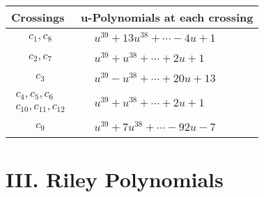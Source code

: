 \documentclass[1p]{elsarticle_modified}
\theoremstyle{definition}
\begin{document}
\begin{tabular}{m{50pt}|m{274pt}}
Crossings & \hspace{64pt}u-Polynomials at each crossing \\
\hline $$\begin{aligned}c_{1},c_{8}\end{aligned}$$&$\begin{aligned}
&u^{39}+13 u^{38}+\cdots-4 u+1
\end{aligned}$\\
\hline $$\begin{aligned}c_{2},c_{7}\end{aligned}$$&$\begin{aligned}
&u^{39}+u^{38}+\cdots+2 u+1
\end{aligned}$\\
\hline $$\begin{aligned}c_{3}\end{aligned}$$&$\begin{aligned}
&u^{39}- u^{38}+\cdots+20 u+13
\end{aligned}$\\
\hline $$\begin{aligned}c_{4},c_{5},c_{6}\\c_{10},c_{11},c_{12}\end{aligned}$$&$\begin{aligned}
&u^{39}+u^{38}+\cdots+2 u+1
\end{aligned}$\\
\hline $$\begin{aligned}c_{9}\end{aligned}$$&$\begin{aligned}
&u^{39}+7 u^{38}+\cdots-92 u-7
\end{aligned}$\\
\hline
\end{tabular}\newpage\renewcommand{\arraystretch}{1}
\centering \section*{ III. Riley Polynomials}
\end{document}
